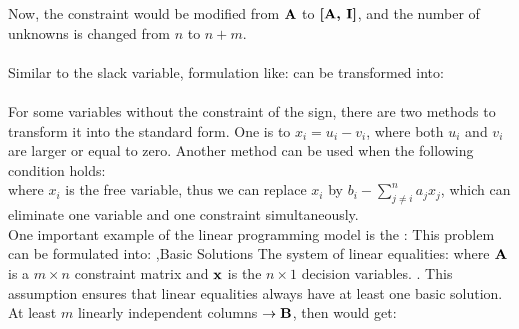 \documentclass[10pt]{report}
\begin{document}
Now, the constraint would be modified from $\textbf{A}$ to $\textbf{[A, I]}$, and the number of unknowns is changed from $n$ to $n+m$.\\
\\
Similar to the slack variable, formulation like:
can be transformed into:
\\
\\
For some variables without the constraint of the sign, there are two methods to transform it into the standard form. One is
to $x_i=u_i-v_i$, where both $u_i$ and $v_i$ are larger or equal to zero. Another method can be used when the following condition holds:\\
where $x_i$ is the free variable, thus we can replace $x_i$ by $b_i-\sum_{j\ne i}^n a_jx_j$, which can eliminate one variable and one constraint simultaneously.\\
One important example of the linear programming model is the :
This problem can be formulated into:
\sep{Basic Solutions}
The system of linear equalities:
where $\textbf{A}$ is a $m\times n$ constraint matrix and $\textbf{x}$ is the $n \times 1$ decision variables.
.
This assumption ensures that linear equalities always have at least one basic solution.
At least $m$ linearly independent columns $\to \textbf{B}$, then would get:
\end{document}
